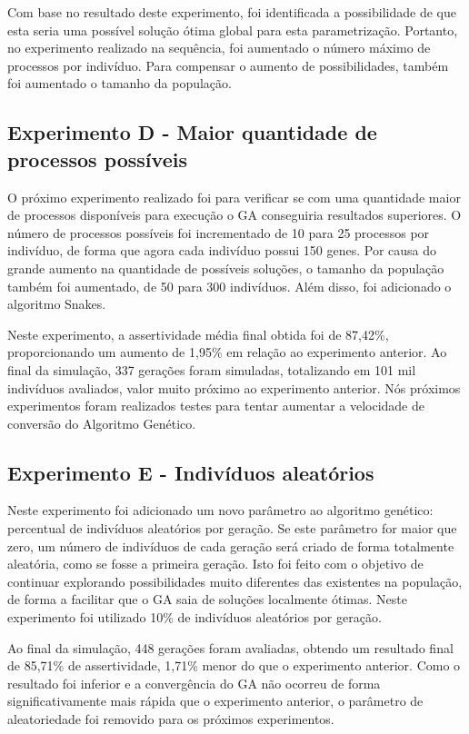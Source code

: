 \documentclass[12pt,oneside,a4paper,english,french,spanish,brazil,]{abntex2}
\begin{document}
Com base no resultado deste experimento, foi identificada a possibilidade de que esta seria uma possível solução ótima global para esta parametrização. Portanto, no experimento realizado na sequência, foi aumentado o número máximo de processos por indivíduo. Para compensar o aumento de possibilidades, também foi aumentado o tamanho da população.

\subsection{Experimento D - Maior quantidade de processos possíveis}

O próximo experimento realizado foi para verificar se com uma quantidade maior de processos disponíveis para execução o GA conseguiria resultados superiores. O número de processos possíveis foi incrementado de 10 para 25 processos por indivíduo, de forma que agora cada indivíduo possui 150 genes. Por causa do grande aumento na quantidade de possíveis soluções, o tamanho da população também foi aumentado, de 50 para 300 indivíduos. Além disso, foi adicionado o algoritmo Snakes.

Neste experimento, a assertividade média final obtida foi de 87,42\%, proporcionando um aumento de 1,95\% em relação ao experimento anterior. Ao final da simulação, 337 gerações foram simuladas, totalizando em 101 mil indivíduos avaliados, valor muito próximo ao experimento anterior. Nós próximos experimentos foram realizados testes para tentar aumentar a velocidade de conversão do Algoritmo Genético.

\subsection{Experimento E - Indivíduos aleatórios}

Neste experimento foi adicionado um novo parâmetro ao algoritmo genético: percentual de indivíduos aleatórios por geração. Se este parâmetro for maior que zero, um número de indivíduos de cada geração será criado de forma totalmente aleatória, como se fosse a primeira geração. Isto foi feito com o objetivo de continuar explorando possibilidades muito diferentes das existentes na população, de forma a facilitar que o GA saia de soluções localmente ótimas. Neste experimento foi utilizado 10\% de indivíduos aleatórios por geração.

Ao final da simulação, 448 gerações foram avaliadas, obtendo um resultado final de 85,71\% de assertividade, 1,71\% menor do que o experimento anterior. Como o resultado foi inferior e a convergência do GA não ocorreu de forma significativamente mais rápida que o experimento anterior, o parâmetro de aleatoriedade foi removido para os próximos experimentos.
\end{document}
